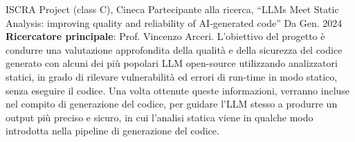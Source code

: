 
\begin{cventries}
	\cventry
	{ISCRA Project (class C), Cineca}
	{Partecipante alla ricerca, \textquotedblleft{LLMs Meet Static Analysis: improving quality and reliability of AI‑generated code}\textquotedblright}
	{}
	{Da Gen. 2024}
	{ \textbf{Ricercatore principale}: Prof. Vincenzo Arceri. L'obiettivo del progetto è condurre una valutazione approfondita della qualità e della sicurezza del codice generato con alcuni dei più popolari LLM open-source utilizzando analizzatori statici, in grado di rilevare vulnerabilità ed errori di run-time in modo statico, senza eseguire il codice. Una volta ottenute queste informazioni, verranno incluse nel compito di generazione del codice, per guidare l'LLM stesso a produrre un output più preciso e sicuro, in cui l'analisi statica viene in qualche modo introdotta nella pipeline di generazione del codice. }

\end{cventries}

